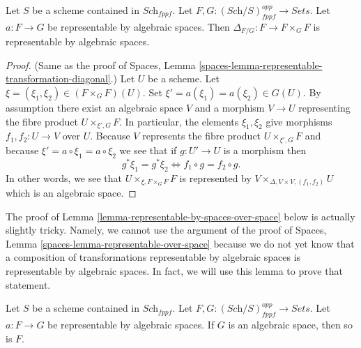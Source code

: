 \begin{lemma}
\label{lemma-representable-by-spaces-transformation-diagonal}
Let $S$ be a scheme contained in $\textit{Sch}_{fppf}$.
Let $F, G : (\textit{Sch}/S)_{fppf}^{opp} \to \textit{Sets}$.
Let $a : F \to G$ be representable by algebraic spaces.
Then $\Delta_{F/G} : F \to F \times_G F$ is representable by
algebraic spaces.
\end{lemma}

\begin{proof}
(Same as the proof of
Spaces, Lemma \ref{spaces-lemma-representable-transformation-diagonal}.)
Let $U$ be a scheme. Let $\xi = (\xi_1, \xi_2) \in (F \times_G F)(U)$.
Set $\xi' = a(\xi_1) = a(\xi_2) \in G(U)$.
By assumption there exist an algebraic space $V$ and a morphism $V \to U$
representing the fibre product $U \times_{\xi', G} F$.
In particular, the elements $\xi_1, \xi_2$ give morphisms
$f_1, f_2 : U \to V$ over $U$. Because $V$ represents the
fibre product $U \times_{\xi', G} F$ and because
$\xi' = a \circ \xi_1 = a \circ \xi_2$
we see that if $g : U' \to U$ is a morphism then
$$
g^*\xi_1 = g^*\xi_2
\Leftrightarrow
f_1 \circ g = f_2 \circ g.
$$
In other words, we see that $U \times_{\xi, F \times_G F} F$
is represented by $V \times_{\Delta, V \times V, (f_1, f_2)} U$
which is an algebraic space.
\end{proof}

\noindent
The proof of
Lemma \ref{lemma-representable-by-spaces-over-space}
below is actually slightly tricky. Namely,
we cannot use the argument of the proof of
Spaces, Lemma \ref{spaces-lemma-representable-over-space}
because we do not yet know that a composition of transformations
representable by algebraic spaces is representable by algebraic
spaces. In fact, we will use this lemma to prove that statement.

\begin{lemma}
\label{lemma-representable-by-spaces-over-space}
Let $S$ be a scheme contained in $\textit{Sch}_{fppf}$.
Let $F, G : (\textit{Sch}/S)_{fppf}^{opp} \to \textit{Sets}$.
Let $a : F \to G$ be representable by algebraic spaces.
If $G$ is an algebraic space, then so is $F$.
\end{lemma}


